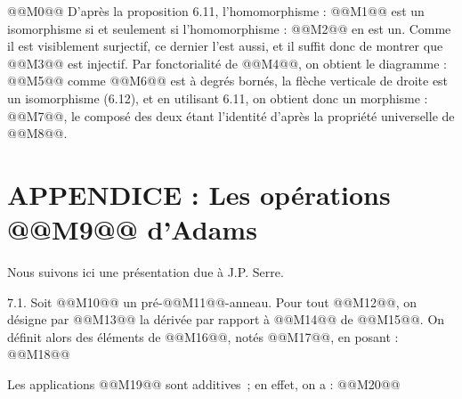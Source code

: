 
@@M0@@
D'après la
proposition 6.11, l'homomorphisme : @@M1@@ est un isomorphisme si et seulement si l'homomorphisme : @@M2@@ en est un. Comme il est visiblement surjectif, ce dernier l'est aussi, et il suffit donc de montrer que @@M3@@ est injectif. Par fonctorialité de @@M4@@, on obtient le diagramme :
@@M5@@
comme @@M6@@ est à degrés bornés, la flèche verticale de droite est un isomorphisme (6.12), et en utilisant 6.11, on obtient donc un morphisme : @@M7@@, le composé des deux étant l'identité d'après la propriété universelle de @@M8@@.

\section*{APPENDICE : Les opérations @@M9@@ d'Adams}

Nous suivons ici une présentation due à J.P. Serre.

7.1. Soit @@M10@@ un pré-@@M11@@-anneau. Pour tout @@M12@@, on désigne par @@M13@@ la dérivée par rapport à @@M14@@ de @@M15@@. On définit alors des éléments de @@M16@@, notés @@M17@@, en posant :
@@M18@@

Les applications @@M19@@ sont additives~; en effet, on a :
@@M20@@
